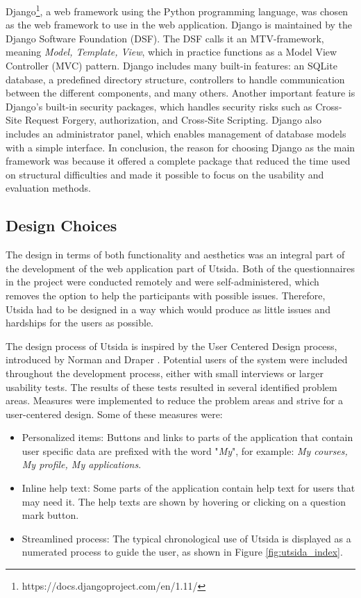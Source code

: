 Django\footnote{https://docs.djangoproject.com/en/1.11/}, a web framework using the Python programming language, was chosen as the web framework to use in the web application. Django is maintained by the Django Software Foundation (DSF). The DSF calls it an MTV-framework, meaning \emph{Model, Template, View}, which in practice functions as a Model View Controller (MVC) pattern. Django includes many built-in features: an SQLite database, a predefined directory structure, controllers to handle communication between the different components, and many others. Another important feature is Django's built-in security packages, which handles security risks such as Cross-Site Request Forgery, authorization, and Cross-Site Scripting. Django also includes an administrator panel, which enables management of database models with a simple interface. In conclusion, the reason for choosing Django as the main framework was because it offered a complete package that reduced the time used on structural difficulties and made it possible to focus on the usability and evaluation methods.

\subsection{Design Choices}
The design in terms of both functionality and aesthetics was an integral part of the development of the web application part of Utsida. Both of the questionnaires in the project were conducted remotely and were self-administered, which removes the option to help the participants with possible issues. Therefore, Utsida had to be designed in a way which would produce as little issues and hardships for the users as possible.

The design process of Utsida is inspired by the User Centered Design process, introduced by Norman and Draper \cite{norman1986user}. Potential users of the system were included throughout the development process, either with small interviews or larger usability tests. The results of these tests resulted in several identified problem areas. Measures were implemented to reduce the problem areas and strive for a user-centered design. Some of these measures were:

\begin{itemize}
    \item Personalized items: Buttons and links to parts of the application that contain user specific data are prefixed with the word "\emph{My}", for example: \emph{My courses, My profile, My applications}.
    \item Inline help text: Some parts of the application contain help text for users that may need it. The help texts are shown by hovering or clicking on a question mark button. 
    \item Streamlined process: The typical chronological use of Utsida is displayed as a numerated process to guide the user, as shown in Figure \ref{fig:utsida_index}.
\end{itemize}

